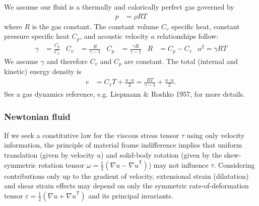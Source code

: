 \documentclass[letterpaper,11pt,nointlimits,reqno]{amsart}
\newcommand{\trans}[1]{{#1}^{\ensuremath{\mathsf{T}}}}
\begin{document}
We assume our fluid is a thermally and calorically perfect gas governed by
\begin{align}
  \label{eq:perfectgaseos}
  p &= \rho{} R T
\end{align}
where $R$ is the gas constant. The constant volume $C_{v}$ specific heat,
constant pressure specific heat $C_{p}$, and acoustic velocity $a$ 
relationships follow:
\begin{align}
  \label{eq:perfectgasrelations}
  \gamma &= \frac{C_{p}}{C_{v}}
  &
  C_{v} &= \frac{R}{\gamma - 1}
  &
  C_{p} &= \frac{\gamma{}R}{\gamma-1}
  &
  R &= C_{p} - C_{v}
  &
  a^{2} = \gamma{}RT
\end{align}
We assume $\gamma$ and therefore $C_{v}$ and $C_{p}$ are constant.
The total (internal and kinetic) energy density is
\begin{align}
  \label{eq:perfectgastotalenergy}
  e &= C_{v} T + \frac{u\cdot{}u}{2}
     = \frac{RT}{\gamma-1} + \frac{u\cdot{}u}{2}
  .
\end{align}
See a gas dynamics reference, e.g. Liepmann \& Roshko 1957, for more details.

\subsubsection{Newtonian fluid}

If we seek a constitutive law for the viscous stress tensor $\tau$
using only velocity information, the principle of material frame
indifference implies that uniform translation (given by velocity $u$)
and solid-body rotation (given by the skew-symmetric rotation tensor
$\omega=\frac{1}{2}\left( \nabla{}u-\trans{\nabla{}u} \right)$)
may not influence $\tau$.  Considering contributions only up to the
gradient of velocity, extensional strain (dilatation) and shear strain
effects may depend on only the symmetric rate-of-deformation tensor
$\varepsilon=\frac{1}{2}\left( \nabla{}u+\trans{\nabla{}u}\right)$
and its principal invariants.
\end{document}
